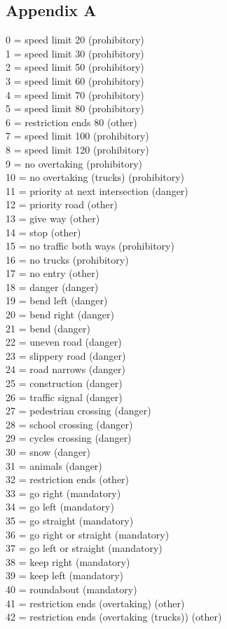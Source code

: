 \documentclass[12pt,a4paper,bibliography=totocnumbered,listof=totocnumbered]{scrartcl}
\begin{document}
\subsection{Appendix A}
0 = speed limit 20 (prohibitory) \\
1 = speed limit 30 (prohibitory) \\
2 = speed limit 50 (prohibitory)\\
3 = speed limit 60 (prohibitory)\\
4 = speed limit 70 (prohibitory)\\
5 = speed limit 80 (prohibitory)\\
6 = restriction ends 80 (other)\\
7 = speed limit 100 (prohibitory)\\
8 = speed limit 120 (prohibitory)\\
9 = no overtaking (prohibitory)\\
10 = no overtaking (trucks) (prohibitory)\\
11 = priority at next intersection (danger)\\
12 = priority road (other)\\
13 = give way (other)\\
14 = stop (other)\\
15 = no traffic both ways (prohibitory)\\
16 = no trucks (prohibitory)\\
17 = no entry (other)\\
18 = danger (danger)\\
19 = bend left (danger)\\
20 = bend right (danger)\\
21 = bend (danger)\\
22 = uneven road (danger)\\
23 = slippery road (danger)\\
24 = road narrows (danger)\\
25 = construction (danger)\\
26 = traffic signal (danger)\\
27 = pedestrian crossing (danger)\\
28 = school crossing (danger)\\
29 = cycles crossing (danger)\\
30 = snow (danger)\\
31 = animals (danger)\\
32 = restriction ends (other)\\
33 = go right (mandatory)\\
34 = go left (mandatory)\\
35 = go straight (mandatory)\\
36 = go right or straight (mandatory)\\
37 = go left or straight (mandatory)\\
38 = keep right (mandatory)\\
39 = keep left (mandatory)\\
40 = roundabout (mandatory)\\
41 = restriction ends (overtaking) (other)\\
42 = restriction ends (overtaking (trucks)) (other)\\
\end{document}
